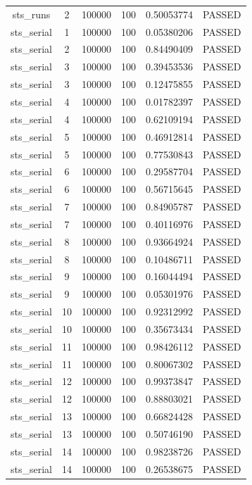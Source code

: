 \begin{longtable}{cccccc}
sts\_runs & 2 & 100000 & 100 & 0.50053774 & PASSED \\
sts\_serial & 1 & 100000 & 100 & 0.05380206 & PASSED \\
sts\_serial & 2 & 100000 & 100 & 0.84490409 & PASSED \\
sts\_serial & 3 & 100000 & 100 & 0.39453536 & PASSED \\
sts\_serial & 3 & 100000 & 100 & 0.12475855 & PASSED \\
sts\_serial & 4 & 100000 & 100 & 0.01782397 & PASSED \\
sts\_serial & 4 & 100000 & 100 & 0.62109194 & PASSED \\
sts\_serial & 5 & 100000 & 100 & 0.46912814 & PASSED \\
sts\_serial & 5 & 100000 & 100 & 0.77530843 & PASSED \\
sts\_serial & 6 & 100000 & 100 & 0.29587704 & PASSED \\
sts\_serial & 6 & 100000 & 100 & 0.56715645 & PASSED \\
sts\_serial & 7 & 100000 & 100 & 0.84905787 & PASSED \\
sts\_serial & 7 & 100000 & 100 & 0.40116976 & PASSED \\
sts\_serial & 8 & 100000 & 100 & 0.93664924 & PASSED \\
sts\_serial & 8 & 100000 & 100 & 0.10486711 & PASSED \\
sts\_serial & 9 & 100000 & 100 & 0.16044494 & PASSED \\
sts\_serial & 9 & 100000 & 100 & 0.05301976 & PASSED \\
sts\_serial & 10 & 100000 & 100 & 0.92312992 & PASSED \\
sts\_serial & 10 & 100000 & 100 & 0.35673434 & PASSED \\
sts\_serial & 11 & 100000 & 100 & 0.98426112 & PASSED \\
sts\_serial & 11 & 100000 & 100 & 0.80067302 & PASSED \\
sts\_serial & 12 & 100000 & 100 & 0.99373847 & PASSED \\
sts\_serial & 12 & 100000 & 100 & 0.88803021 & PASSED \\
sts\_serial & 13 & 100000 & 100 & 0.66824428 & PASSED \\
sts\_serial & 13 & 100000 & 100 & 0.50746190 & PASSED \\
sts\_serial & 14 & 100000 & 100 & 0.98238726 & PASSED \\
sts\_serial & 14 & 100000 & 100 & 0.26538675 & PASSED \\

\end{longtable}
